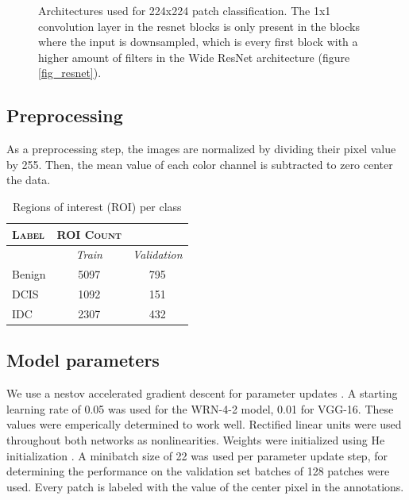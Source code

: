 \documentclass[journal]{IEEEtran}
\begin{document}
\begin{figure}[!t]
{\label{fig_vgg}}
\vspace{-0.12cm}
\caption{Architectures used for 224x224 patch classification. The 1x1 convolution layer in the resnet blocks is only present in the blocks where the input is downsampled, which is every first block with a higher amount of filters in the Wide ResNet architecture (figure \ref{fig_resnet}).}
\label{fig_architectures}
\end{figure}

\subsection{Preprocessing}
As a preprocessing step, the images are normalized by dividing their pixel value by 255. Then, the mean value of each color channel is subtracted to zero center the data.

\begin{table}[!t]
\renewcommand{\arraystretch}{1.1}
\caption{Regions of interest (ROI) per class}
\label{table_roi_count}
\centering
\begin{tabular}{|lcc|}
\hline
\textsc{Label}&\textsc{ROI Count}&\\
\hline
&\textit{Train}&\textit{Validation}\\
Benign&5097& 795\\
DCIS&1092&  151\\
IDC&2307& 432\\
\hline

\end{tabular}
\end{table}


\subsection{Model parameters}
We use a nestov accelerated gradient descent for parameter updates \cite{nesterov}. A starting learning rate of 0.05 was used for the WRN-4-2 model, 0.01 for VGG-16. These values were emperically determined to work well. Rectified linear units were used throughout both networks as nonlinearities. Weights were initialized using He initialization \cite{he_init}. A minibatch size of 22 was used per parameter update step, for determining the performance on the validation set batches of 128 patches were used. Every patch is labeled with the value of the center pixel in the annotations. 
\end{document}
